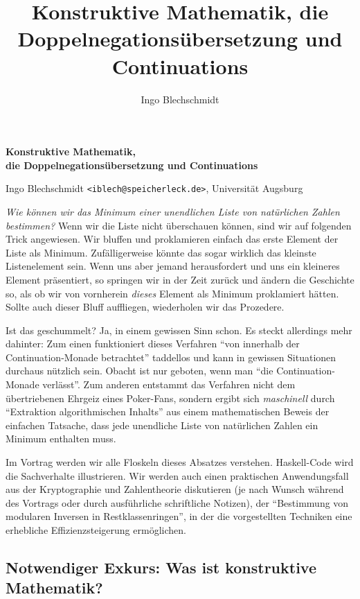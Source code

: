\documentclass[a4paper,ngerman,10pt]{scrartcl}
\title{Konstruktive Mathematik, die Doppelnegationsübersetzung und Continuations}
\author{Ingo Blechschmidt}
\theoremstyle{plain}
\begin{document}
\begin{center}\large\textsf{\textbf{Konstruktive Mathematik, \\ die
Doppelnegationsübersetzung und Continuations}}

\normalsize Ingo Blechschmidt \texttt{<iblech@speicherleck.de>}, Universität
Augsburg\end{center}

\emph{Wie können wir das Minimum einer unendlichen Liste von natürlichen
Zahlen bestimmen?} Wenn wir die Liste nicht überschauen können, sind wir auf folgenden Trick
angewiesen. Wir bluffen und proklamieren einfach das erste Element der Liste als
Minimum. Zufälligerweise könnte das sogar wirklich das kleinste Listenelement
sein. Wenn uns aber jemand herausfordert und uns ein kleineres Element
präsentiert, so springen wir in der Zeit zurück und ändern die Geschichte
so, als ob wir von vornherein \emph{dieses} Element als Minimum proklamiert
hätten. Sollte auch dieser Bluff auffliegen, wiederholen wir das Prozedere.

Ist das geschummelt? Ja, in einem gewissen Sinn schon. Es steckt allerdings
mehr dahinter: Zum einen funktioniert dieses Verfahren "`von innerhalb der
Continuation-Monade betrachtet"' taddellos und kann in gewissen Situationen
durchaus nützlich sein. Obacht ist nur geboten, wenn man "`die
Continuation-Monade verlässt"'. Zum anderen entstammt das Verfahren nicht dem
übertriebenen Ehrgeiz eines Poker-Fans, sondern ergibt sich \emph{maschinell}
durch "`Extraktion algorithmischen Inhalts"' aus einem mathematischen Beweis
der einfachen Tatsache, dass jede unendliche Liste von natürlichen Zahlen ein
Minimum enthalten muss.

Im Vortrag werden wir alle Floskeln dieses Absatzes verstehen. Haskell-Code
wird die Sachverhalte illustrieren. Wir werden auch einen praktischen
Anwendungsfall aus der Kryptographie und Zahlentheorie diskutieren (je nach
Wunsch während des Vortrags oder durch ausführliche schriftliche Notizen), der
"`Bestimmung von modularen Inversen in Restklassenringen"', in der die
vorgestellten Techniken eine erhebliche Effizienzsteigerung ermöglichen.


\subsection*{Notwendiger Exkurs: Was ist konstruktive Mathematik?}
\end{document}
